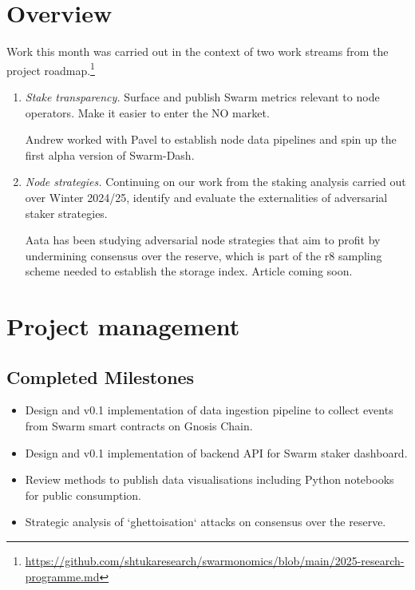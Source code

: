 \maketitle
\section*{Overview}

Work this month was carried out in the context of two work streams from the project roadmap.\footnote{\url{https://github.com/shtukaresearch/swarmonomics/blob/main/2025-research-programme.md}}

\begin{enumerate}
\item \emph{Stake transparency.} Surface and publish Swarm metrics relevant to node operators. Make it easier to enter the NO market.

Andrew worked with Pavel to establish node data pipelines and spin up the first alpha version of Swarm-Dash.

\item \emph{Node strategies.}  Continuing on our work from the staking analysis carried out over Winter 2024/25, identify and evaluate the externalities of adversarial staker strategies.

Aata has been studying adversarial node strategies that aim to profit by undermining consensus over the reserve, which is part of the r8 sampling scheme needed to establish the storage index. Article coming soon.

\end{enumerate}
\section*{Project management}

\subsection*{Completed Milestones}

\begin{itemize}
  \item 
    Design and v0.1 implementation of data ingestion pipeline to collect events from Swarm smart contracts on Gnosis Chain.
  \item 
    Design and v0.1 implementation of backend API for Swarm staker dashboard.
  \item
    Review methods to publish data visualisations including Python notebooks for public consumption.
  \item
    Strategic analysis of `ghettoisation` attacks on consensus over the reserve.

\end{itemize}

